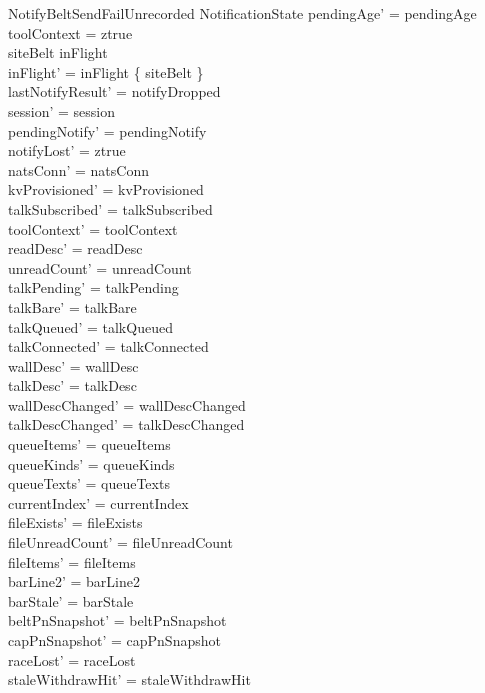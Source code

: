 \documentclass[a4paper,10pt,fleqn]{article}
\begin{document}
\begin{schema}{NotifyBeltSendFailUnrecorded}
  \Delta NotificationState
  \where
  pendingAge' = pendingAge \\
  toolContext = ztrue \\
  siteBelt \in inFlight \\
  inFlight' = inFlight \setminus \{ siteBelt \} \\
  lastNotifyResult' = notifyDropped \\
  session' = session \\
  pendingNotify' = pendingNotify \\
  notifyLost' = ztrue \\
  natsConn' = natsConn \\
  kvProvisioned' = kvProvisioned \\
  talkSubscribed' = talkSubscribed \\
  toolContext' = toolContext \\
  readDesc' = readDesc \\
  unreadCount' = unreadCount \\
  talkPending' = talkPending \\
  talkBare' = talkBare \\
  talkQueued' = talkQueued \\
  talkConnected' = talkConnected \\
  wallDesc' = wallDesc \\
  talkDesc' = talkDesc \\
  wallDescChanged' = wallDescChanged \\
  talkDescChanged' = talkDescChanged \\
  queueItems' = queueItems \\
  queueKinds' = queueKinds \\
  queueTexts' = queueTexts \\
  currentIndex' = currentIndex \\
  fileExists' = fileExists \\
  fileUnreadCount' = fileUnreadCount \\
  fileItems' = fileItems \\
  barLine2' = barLine2 \\
  barStale' = barStale \\
  beltPnSnapshot' = beltPnSnapshot \\
  capPnSnapshot' = capPnSnapshot \\
  raceLost' = raceLost \\
  staleWithdrawHit' = staleWithdrawHit \\

\end{schema}
\end{document}
